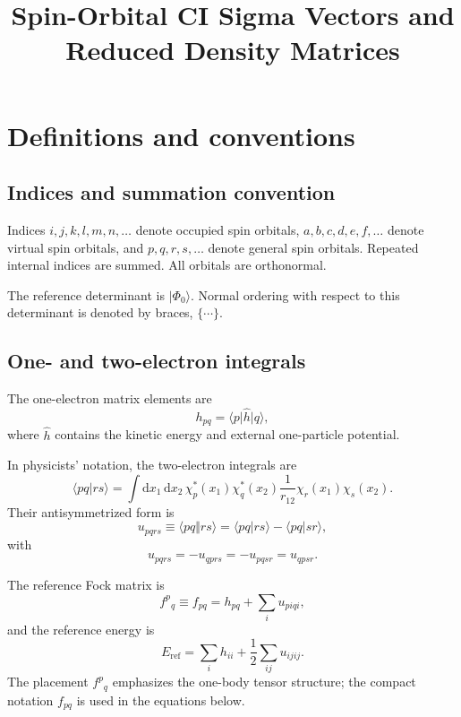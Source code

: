 \documentclass[11pt]{article}
\title{Spin-Orbital CI Sigma Vectors and Reduced Density Matrices}
\author{}
\date{}
\newcommand{\Eref}{E_{\mathrm{ref}}}
\newcommand{\vac}{\Phi_0}
\begin{document}
\maketitle
\begingroup
\small
\tableofcontents
\endgroup

\section{Definitions and conventions}

\subsection{Indices and summation convention}

Indices $i,j,k,l,m,n,\ldots$ denote occupied spin orbitals,
$a,b,c,d,e,f,\ldots$ denote virtual spin orbitals, and
$p,q,r,s,\ldots$ denote general spin orbitals.  Repeated internal indices
are summed.  All orbitals are orthonormal.

The reference determinant is $\lvert\vac\rangle$.  Normal ordering with
respect to this determinant is denoted by braces, $\{\cdots\}$.

\subsection{One- and two-electron integrals}

The one-electron matrix elements are
\begin{equation}
 h_{pq}
 = \langle p\lvert \hat{h}\rvert q\rangle,
\end{equation}
where $\hat{h}$ contains the kinetic energy and external one-particle
potential.

In physicists' notation, the two-electron integrals are
\begin{equation}
 \langle pq\lvert rs\rangle
 = \int \! \mathrm{d}x_1\,\mathrm{d}x_2\,
   \chi_p^{*}(x_1)\chi_q^{*}(x_2)
   \frac{1}{r_{12}}
   \chi_r(x_1)\chi_s(x_2).
\end{equation}
Their antisymmetrized form is
\begin{equation}
 u_{pqrs}
 \equiv \langle pq\Vert rs\rangle
 = \langle pq\lvert rs\rangle-\langle pq\lvert sr\rangle,
\end{equation}
with
\begin{equation}
 u_{pqrs}=-u_{qprs}=-u_{pqsr}=u_{qpsr}.
\end{equation}

The reference Fock matrix is
\begin{equation}
 f^{p}{}_{q}
 \equiv f_{pq}
 = h_{pq}+\sum_i u_{piqi},
\end{equation}
and the reference energy is
\begin{equation}
 \Eref
 = \sum_i h_{ii}+\frac{1}{2}\sum_{ij}u_{ijij}.
\end{equation}
The placement $f^{p}{}_{q}$ emphasizes the one-body tensor structure;
the compact notation $f_{pq}$ is used in the equations below.
\end{document}

